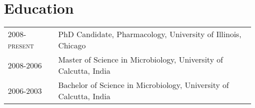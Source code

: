 \documentclass[a4paper, oneside, final]{scrartcl}
\begin{document}
\begin{center}
\textsc{\huge{}}

%
%
%
\section{Education}
\newcommand{\gray}{\rowcolor[gray]{.90}}
\begin{tabularx}{0.98\linewidth}{>{\raggedleft\scshape}p{2cm}X}
2008- \tiny{present}  &  \small{PhD Candidate, Pharmacology, University of Illinois, Chicago} \\
2008-2006 &  \small{Master of Science in Microbiology, University of Calcutta, India }\\ 
2006-2003 & \small{Bachelor of Science in Microbiology, University of Calcutta, India }\\ 
\end{tabularx}




\end{center}
\end{document}
